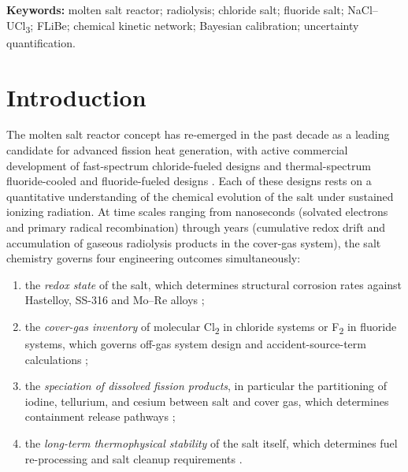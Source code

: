 \documentclass[11pt]{article}
\theoremstyle{plain}
\theoremstyle{definition}
\theoremstyle{remark}
\begin{document}
\noindent\textbf{Keywords:}
molten salt reactor;
radiolysis;
chloride salt;
fluoride salt;
NaCl--UCl\textsubscript{3};
FLiBe;
chemical kinetic network;
Bayesian calibration;
uncertainty quantification.

\bigskip

\section{Introduction}\label{sec:intro}

The molten salt reactor concept has re-emerged in the past decade as a leading
candidate for advanced fission heat generation, with active commercial
development of fast-spectrum chloride-fueled designs
\citep{Mausolf2024,TerraPower2021} and thermal-spectrum fluoride-cooled and
fluoride-fueled designs \citep{Forsberg2020,Andreades2014,Holcomb2012}.  Each
of these designs rests on a quantitative understanding of the chemical
evolution of the salt under sustained ionizing radiation.  At time scales
ranging from nanoseconds (solvated electrons and primary radical
recombination) through years (cumulative redox drift and accumulation of
gaseous radiolysis products in the cover-gas system), the salt chemistry
governs four engineering outcomes simultaneously:

\begin{enumerate}
\item the \emph{redox state} of the salt, which determines structural
      corrosion rates against Hastelloy, SS-316 and Mo--Re alloys
      \citep{Carotti2017,Olander2002};
\item the \emph{cover-gas inventory} of molecular Cl\textsubscript{2} in
      chloride systems or F\textsubscript{2} in fluoride systems, which
      governs off-gas system design and accident-source-term calculations
      \citep{Sohal2010,IAEA2013MSR};
\item the \emph{speciation of dissolved fission products}, in particular the
      partitioning of iodine, tellurium, and cesium between salt and cover
      gas, which determines containment release pathways
      \citep{Briggs1964,Williams2006};
\item the \emph{long-term thermophysical stability} of the salt itself,
      which determines fuel re-processing and salt cleanup requirements
      \citep{Romatoski2017,Yoshikawa2018}.
\end{enumerate}
\end{document}
